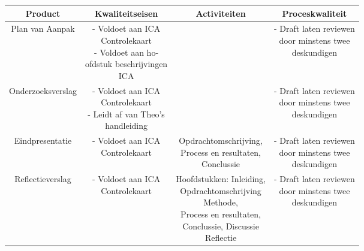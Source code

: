 \small
\begin{center}
 \begin{tabular}{|c c c c|} 
 
 \hline
 Product & Kwaliteitseisen & Activiteiten & Proceskwaliteit \\ [0.5ex] 
 \hline
 Plan van Aanpak & \makecell{
 - Voldoet aan ICA\\Controlekaart \cite{icaControl}\\
 - Voldoet aan ho-\\ofdstuk beschrijvingen\\ICA\cite{pvaTut}
 } & \cite{pvaTut} & \makecell{
 - Draft laten reviewen\\door minstens twee\\deskundigen
 } \\
 \hline

 \hline
 \makecell{
 Onderzoeksverslag\\
 } & \makecell{
 - Voldoet aan ICA\\Controlekaart \cite{icaControl}\\
 - Leidt af van Theo's\\ handleiding \cite{theoOnderzoek}
 } & \makecell{\cite{theoOnderzoek}\\\cite{icaOnderzoek}} & \makecell{
 - Draft laten reviewen\\door minstens twee\\deskundigen
 } \\
 \hline
 
 \hline
 Eindpresentatie & \makecell{
 - Voldoet aan ICA\\Controlekaart \cite{icaControl}
 } & \makecell{Opdrachtomschrijving,\\Process en resultaten,\\Conclussie} & \makecell{
 - Draft laten reviewen\\door minstens twee\\deskundigen
 } \\
 \hline
 
 \hline
 Reflectieverslag & \makecell{
 - Voldoet aan ICA\\Controlekaart \cite{icaControl}
 } & \makecell{
 Hoofdstukken: Inleiding,\\
 Opdrachtomschrijving\\
 Methode,\\
 Process en resultaten,\\
 Conclussie, Discussie\\
 Reflectie\\
 }& \makecell{
 - Draft laten reviewen\\door minstens twee\\deskundigen
 } \\
 \hline
 

\end{tabular}
\end{center}
